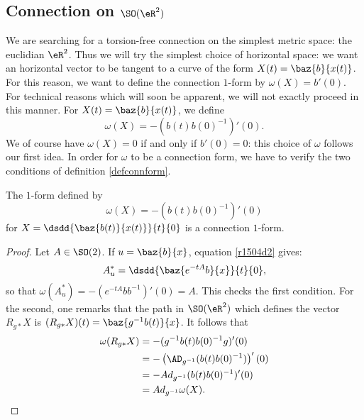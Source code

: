 \subsection{Connection on \texorpdfstring{$\SO(\eR^2)$}{SO(R2)}}

We are searching for a torsion-free connection on the simplest metric space: the euclidian $\eR^2$. Thus we will try the simplest choice of horizontal space: we want an horizontal vector to be tangent to a curve of the form $X(t)=\baz{b}{x(t)}$. For this reason, we want to define the connection $1$-form by $\omega(X)=b'(0)$. For technical reasons which will soon be apparent, we will not exactly proceed in this manner. For $X(t)=\baz{b}{x(t)}$, we define
\begin{equation}
                       \omega(X)=-(b(t)b(0)^{-1})'(0).
\end{equation}
We of course have $\omega(X)=0$ if and only if $b'(0)=0$: this choice of $\omega$ follows our first idea. In order for $\omega$ to be a connection form, we have to verify the two conditions of definition \ref{defconnform}.

\begin{proposition}
The $1$-form defined by
\[
              \omega(X)=-(b(t)b(0)^{-1})'(0)
\]
for $X=\displaystyle\dsdd{\baz{b(t)}{x(t)}}{t}{0}$ is a connection $1$-form.
\end{proposition}

\begin{proof}
Let $A\in \SO(2)$. If $u=\baz{b}{x}$, equation \eqref{r1504d2} gives:
\[
   A^*_u=\dsdd{\baz{e^{-tA}b}{x}}{t}{0},
\]
 so that $\omega(A^*_u)=-(e^{-tA}bb^{-1})'(0)=A$. This checks the first condition. For the second, one remarks that the path in $\SO(\eR^2)$ which defines the vector $R_{g*}X$ is $(R_{g*}X)(t)=\baz{g^{-1} b(t)}{x}$. It follows that
\begin{equation}
\begin{split}
\omega(R_{g*}X)&=-(g^{-1} b(t)b(0)^{-1} g)'(0)\\
               &=-\left(\AD_{g^{-1}}(b(t)b(0)^{-1})\right)'(0)\\
               &=-Ad_{g^{-1}}(b(t)b(0)^{-1})'(0)\\
               &=Ad_{g^{-1}}\omega(X).
\end{split}
\end{equation}

\end{proof}

